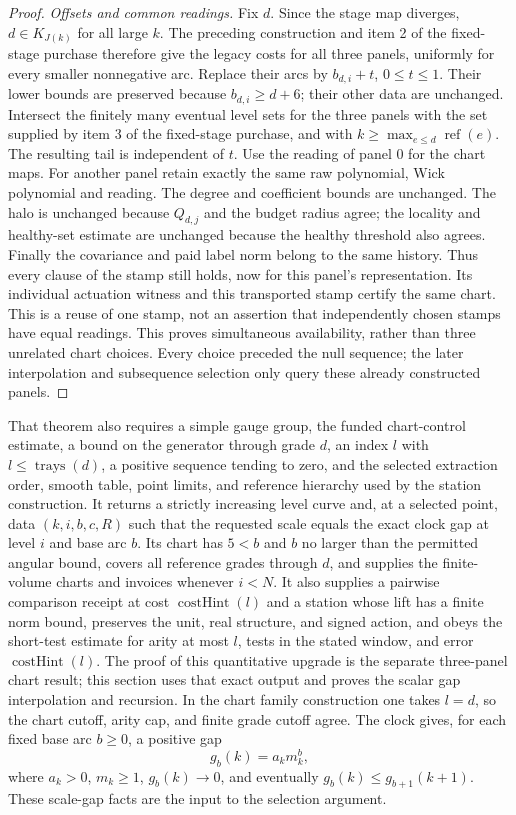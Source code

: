 \begin{proof}
\emph{Offsets and common readings.}
Fix $d$. Since the stage map diverges, $d\in K_{J(k)}$ for all large
$k$. The preceding construction and item 2 of the fixed-stage purchase therefore give the
legacy costs for all three panels, uniformly for every smaller
nonnegative arc. Replace their arcs by $b_{d,i}+t$, $0\le t\le1$.
Their lower bounds are preserved because $b_{d,i}\ge d+6$; their other
data are unchanged. Intersect the finitely many eventual level sets
for the three panels with the set supplied by item 3 of the fixed-stage purchase, and with
$k\ge\max_{e\le d}\operatorname{ref}(e)$. The resulting tail is
independent of $t$. Use the reading of panel $0$ for the chart maps.
For another panel retain exactly the same raw polynomial, Wick
polynomial and reading. The degree and coefficient bounds are unchanged.
The halo is unchanged because $Q_{d,j}$ and the budget radius agree;
the locality and healthy-set estimate are unchanged because the healthy
threshold also agrees. Finally the covariance and paid label norm belong
to the same history. Thus every clause of the stamp still holds, now
for this panel's representation. Its individual actuation witness and
this transported stamp certify the same chart. This is a reuse of one
stamp, not an assertion that independently chosen stamps have equal
readings. This proves
simultaneous availability, rather than three unrelated chart choices.
Every choice preceded the null sequence; the later interpolation and
subsequence selection only query these already constructed panels.
\end{proof}

That theorem also requires a simple gauge group, the funded chart-control
estimate, a bound on the generator through grade $d$, an index $l$ with
$l\leq\operatorname{trays}(d)$, a positive sequence tending to zero, and
the selected extraction order, smooth table, point limits, and reference
hierarchy used by the station construction.
It returns a strictly increasing level curve and, at a selected point,
data $(k,i,b,c,R)$ such that the requested scale equals the exact clock
gap at level $i$ and base arc $b$. Its chart has $5<b$ and $b$ no larger
than the permitted angular bound, covers all reference grades through
$d$, and supplies the finite-volume charts and invoices whenever $i<N$.
It also supplies a pairwise comparison receipt at cost
$\operatorname{costHint}(l)$ and a station whose lift has a finite norm
bound, preserves the unit, real structure, and signed action, and obeys
the short-test estimate for arity at most $l$, tests in the stated window,
and error $\operatorname{costHint}(l)$. The proof of this quantitative
upgrade is the separate three-panel chart result; this section uses that
exact output and proves the scalar gap interpolation and recursion. In
the chart family construction one takes $l=d$, so the chart cutoff, arity cap,
and finite grade cutoff agree. The clock gives, for each fixed base arc
$b\geq0$, a positive gap
\begin{equation}\label{eq:ex-lattice-firesky-gap}
 g_b(k)=a_k m_k^b,
\end{equation}
where $a_k>0$, $m_k\geq1$, $g_b(k)\to0$, and eventually
$g_b(k)\leq g_{b+1}(k+1)$. These scale-gap facts are the input to the
selection argument.

